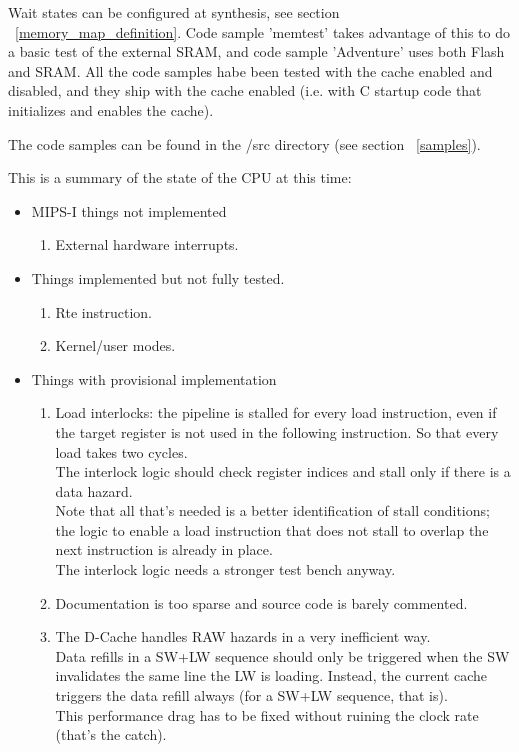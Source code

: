     Wait states can be configured at synthesis, see section 
    ~\ref{memory_map_definition}.
    Code sample 'memtest' takes advantage of this to do a basic test of the
    external SRAM, and code sample 'Adventure' uses both Flash and SRAM.
    All the code samples habe been tested with the cache enabled and disabled, 
    and they ship with the cache enabled (i.e. with C startup code that 
    initializes and enables the cache).
    
    
    The code samples can be found in the /src directory (see section 
    ~\ref{samples}).


    This is a summary of the state of the CPU at this time:
\begin{itemize}
    \item MIPS-I things not implemented
    \begin{enumerate}
        \item External hardware interrupts.
    \end{enumerate}

    \item Things implemented but not fully tested.
    \begin{enumerate}
        \item Rte instruction.
        \item Kernel/user modes.
    \end{enumerate}

    \item Things with provisional implementation
    \begin{enumerate}
        \item Load interlocks: the pipeline is stalled for every load instruction,
            even if the target register is not used in the following
            instruction. So that every load takes two cycles.\\
            The interlock logic should check register indices and stall only if
            there is a data hazard.\\
            Note that all that's needed is a better identification of stall
            conditions; the logic to enable a load instruction that does not
            stall to overlap the next instruction is already in place.\\
            The interlock logic needs a stronger test bench anyway.
        \item Documentation is too sparse and source code is barely commented.\\
        \item The D-Cache handles RAW hazards in a very inefficient way.\\
            Data refills in a SW+LW sequence should only be triggered when the
            SW invalidates the same line the LW is loading. Instead, the current
            cache triggers the data refill always (for a SW+LW sequence, that 
            is).\\
            This performance drag has to be fixed without ruining the clock rate
            (that's the catch).
    \end{enumerate}
\end{itemize}

